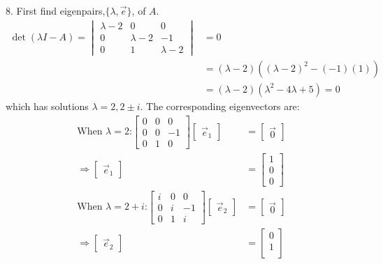 \documentclass[11pt]{homework}
\begin{document}
8. First find eigenpairs,$ \{\lambda, \vec e\} $, of $A$.
\begin{align*}
\det (\lambda I - A) = 
  \begin{vmatrix}
    \lambda -2 & 0 & 0 \\
    0 & \lambda -2 & -1 \\
    0 & 1 & \lambda -2 
  \end{vmatrix} 
  &= 0 \\
  &= (\lambda - 2) ( (\lambda-2)^2 - (-1)(1)) \\
  &= (\lambda - 2) (\lambda^2 - 4 \lambda + 5) =0
\end{align*}
which has solutions $\lambda=2, 2 \pm i$. 
The corresponding eigenvectors are:
\begin{align*}
\text{When $\lambda = 2$:}
  \begin{bmatrix}
    0 & 0 & 0 \\
    0 & 0 & -1 \\
    0 & 1 & 0 
  \end{bmatrix}
  \begin{bmatrix}
    \vec e_1
  \end{bmatrix}
  &=
  \begin{bmatrix}
    \vec 0
  \end{bmatrix} \\
\Rightarrow
  \begin{bmatrix}
    \vec e_1
  \end{bmatrix}
  &=
  \begin{bmatrix}
  1 \\
  0 \\
  0
  \end{bmatrix} \\
\text{When $\lambda = 2+i$:}
  \begin{bmatrix}
    i & 0 & 0 \\
    0 & i & -1 \\
    0 & 1 & i
  \end{bmatrix}
  \begin{bmatrix}
    \vec e_2
  \end{bmatrix}
  &=
  \begin{bmatrix}
    \vec 0
  \end{bmatrix} \\
\Rightarrow
  \begin{bmatrix}
    \vec e_2
  \end{bmatrix}
  &=
  \begin{bmatrix}
    0 \\
    1 \\

\end{bmatrix}
\end{align*}
\end{document}
